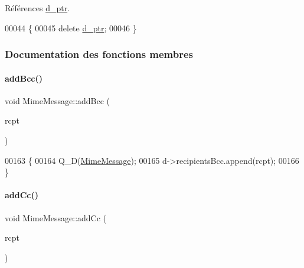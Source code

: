 Références \hyperlink{class_simple_mail_1_1_mime_message_abb70ca7430a820f75203dd6bd66cc47f}{d\+\_\+ptr}.


\begin{DoxyCode}
00044 \{
00045     \textcolor{keyword}{delete} \hyperlink{class_simple_mail_1_1_mime_message_abb70ca7430a820f75203dd6bd66cc47f}{d\_ptr};
00046 \}
\end{DoxyCode}


\subsubsection{Documentation des fonctions membres}
\mbox{\label{class_simple_mail_1_1_mime_message_a53d3717ede759eed8244470093e6290a}} 
\paragraph{\texorpdfstring{add\+Bcc()}{addBcc()}}
{\footnotesize\ttfamily void Mime\+Message\+::add\+Bcc (\begin{DoxyParamCaption}\item[{const \hyperlink{class_simple_mail_1_1_email_address}{Email\+Address} \&}]{rcpt }\end{DoxyParamCaption})}


\begin{DoxyCode}
00163 \{
00164     Q\_D(\hyperlink{class_simple_mail_1_1_mime_message}{MimeMessage});
00165     d->recipientsBcc.append(rcpt);
00166 \}
\end{DoxyCode}
\mbox{\label{class_simple_mail_1_1_mime_message_a3fe778b09344f89f9b83b6d95ed5ce83}} 
\paragraph{\texorpdfstring{add\+Cc()}{addCc()}}
{\footnotesize\ttfamily void Mime\+Message\+::add\+Cc (\begin{DoxyParamCaption}\item[{const \hyperlink{class_simple_mail_1_1_email_address}{Email\+Address} \&}]{rcpt }\end{DoxyParamCaption})}


